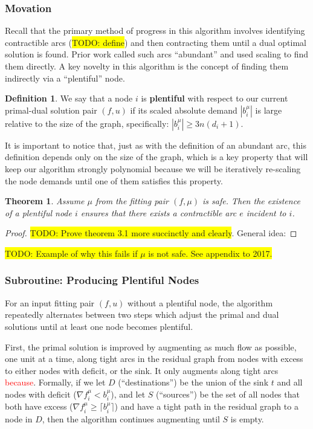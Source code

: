 \documentclass[12pt]{article}
\newtheorem{theorem}{Theorem}[section]
\theoremstyle{definition}
\newtheorem{definition}{Definition}[section]
\newcommand{\rewrite}[1]{\textcolor{red}{#1}}
\newcommand{\todo}[1]{\colorbox{yellow}{TODO: #1}}
\begin{document}
\subsubsection{Movation}

Recall that the primary method of progress in this algorithm involves
identifying contractible arcs (\todo{define}) and then contracting them until a dual optimal
solution is found. Prior work called such arcs ``abundant'' and used scaling to
find them directly. A key novelty in this algorithm is the concept of finding
them indirectly via a ``plentiful'' node. 
\begin{definition}
We say that a node $i$ is \textbf{plentiful} with respect
to our current primal-dual solution pair $(f,u)$ if its scaled absolute
demand $|b_i^{\mu}|$ is large relative to the size of the graph, specifically:
$|b_i^{\mu}| \ge 3n(d_i + 1)$.
\end{definition}

It is important to notice that, just as with the definition of an abundant  arc,
this definition depends only on the size of the graph, which is a key property
that will keep our algorithm strongly polynomial because we will be iteratively
re-scaling the node demands until one of them satisfies this property.

\begin{theorem} Assume $\mu$ from the fitting pair $(f,\mu)$ is safe.
Then the existence of a plentiful node $i$ ensures
that there exists a contractible arc $e$ incident to $i$.
\end{theorem}
\begin{proof}
\todo{Prove theorem 3.1 more succinctly and clearly}. General idea: 
\end{proof}
\todo{Example of why this fails if $\mu$ is not safe. See appendix to 2017.}

\subsubsection{Subroutine: Producing Plentiful Nodes}
\label{sec:sub-ppn}

For an input fitting pair $(f,u)$ without a plentiful node, the algorithm
repeatedly alternates between two steps which adjust the primal and dual
solutions until at least one node becomes plentiful.

First, the primal solution is improved by augmenting as much flow as possible,
one unit at a time, along tight arcs in the residual graph 
from nodes with excess to either nodes with deficit, or the sink.
It only augments along tight arcs \rewrite{because}. Formally, if we let
$D$ (``destinations'') be the union of the sink $t$ and all nodes with 
deficit ($\nabla f_i^{\mu} < b_i^{\mu}$), and let $S$ (``sources'') be
the set of all nodes that both have excess ($\nabla f_i^{\mu} \ge \lceil b_i^{\mu} \rceil$)
and have a tight path in the residual graph to a node in $D$, then the algorithm
continues augmenting until $S$ is empty.
\end{document}
